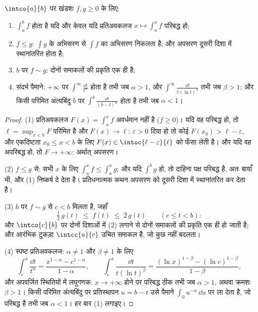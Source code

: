 \begin{theorem}[धनात्मक तुलना का औज़ार-बक्सा]\label{thm:b2:integration:comparison}
$\intco{a}{b}$ पर खंडशः  $f, g \geq 0$ के लिए:
\begin{enumerate}
  \item $\int_a^b f$  होता है यदि और केवल यदि प्रतिअवकलज $x \mapsto \int_a^x
        f$ परिबद्ध हो;
  \item $f \leq g$: $\int g$ के अभिसरण से $\int f$ का अभिसरण निकलता है; और अपसरण दूसरी
        दिशा में स्थानांतरित होता है;
  \item $b$ पर $f \sim g$: दोनों समाकलों की प्रकृति एक ही है;
  \item संदर्भ पैमाने: $+\infty$ पर $\int^{\infty}
        \frac{\dd t}{t^\alpha}$  होता है तभी जब $\alpha > 1$, और $\int^\infty \frac{\dd t}{t(\ln t)^\beta}$
        तभी जब $\beta > 1$; और किसी परिमित अंत्यबिंदु $b$ पर $\int^b \frac{\dd t}{(b -
        t)^\alpha}$  होता
        है तभी जब $\alpha < 1$।
\end{enumerate}
\end{theorem}

\begin{proof}
(1) प्रतिअवकलज $F(x) = \int_a^x f$ अवर्धमान नहीं है ($f \geq
0$)। यदि वह परिबद्ध हो, तो $\ell = \sup_{x < b}F$
परिमित है और $F(x) \to \ell$: $\varepsilon > 0$ दिया हो तो कोई $F(x_0) > \ell -
\varepsilon$, और एकदिष्टता $x_0 \leq x < b$ के लिए $F(x) \in
\intoc{\ell - \varepsilon}{\ell}$
को फँसा लेती है। और यदि वह अपरिबद्ध हो, तो $F \to +\infty$: अर्थात् अपसरण।

(2) $f \leq g$ से: सभी $x$ के लिए $\int_a^x f \leq \int_a^x g$; और यदि $\int^b g$  हो, तो दाहिना पक्ष
परिबद्ध है, अतः बायाँ भी, और (1) निष्कर्ष दे देता है। प्रतिधनात्मक कथन
अपसरण को दूसरी दिशा में स्थानांतरित कर देता है।

(3) $b$ पर $f \sim g$ से $c < b$ मिलता है, जहाँ
\[
\tfrac12\,g(t) \;\leq\; f(t) \;\leq\; 2\,g(t)
\qquad (c \leq t < b) :
\]
और $\intco{c}{b}$ पर दोनों दिशाओं में (2) लगाने से दोनों समाकलों की प्रकृति एक ही
हो जाती है; और आरंभिक टुकड़ा $\intcc{a}{c}$ उचित समाकल है, जो कुछ नहीं बदलता।

(4) स्पष्ट प्रतिअवकलज: $\alpha \neq 1$ और $\beta \neq 1$ के लिए
\[
\int_c^x \frac{\dd t}{t^\alpha}
= \frac{x^{1-\alpha} - c^{1-\alpha}}{1 - \alpha},
\qquad
\int_c^x \frac{\dd t}{t(\ln t)^\beta}
= \frac{(\ln x)^{1-\beta} - (\ln c)^{1-\beta}}{1 - \beta},
\]
और अपवर्जित स्थितियों में लघुगणक: $x \to
+\infty$ होने पर परिबद्ध ठीक तभी जब $\alpha > 1$,
अथवा क्रमशः $\beta > 1$। किसी परिमित अंत्यबिंदु पर प्रतिस्थापन $u = b - t$ उसे पैमाने $\int_0 u^{-\alpha}\,\dd u$
पर ला देता है, जो परिबद्ध है तभी जब $\alpha < 1$। हर बार (1) लगाइए।
\end{proof}

